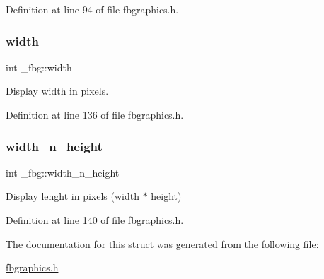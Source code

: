 Definition at line 94 of file fbgraphics.\+h.

\mbox{\label{struct__fbg_a1d3c76643e4ee424f4d17e27991d5e2e}} 
\subsubsection{\texorpdfstring{width}{width}}
{\footnotesize\ttfamily int \+\_\+fbg\+::width}



Display width in pixels. 



Definition at line 136 of file fbgraphics.\+h.

\mbox{\label{struct__fbg_a1ab3f10e8c3483d7286db9850511d46d}} 
\subsubsection{\texorpdfstring{width\+\_\+n\+\_\+height}{width\_n\_height}}
{\footnotesize\ttfamily int \+\_\+fbg\+::width\+\_\+n\+\_\+height}



Display lenght in pixels (width $\ast$ height) 



Definition at line 140 of file fbgraphics.\+h.



The documentation for this struct was generated from the following file\+:\begin{DoxyCompactItemize}
\item 
\mbox{\hyperlink{fbgraphics_8h}{fbgraphics.\+h}}\end{DoxyCompactItemize}
